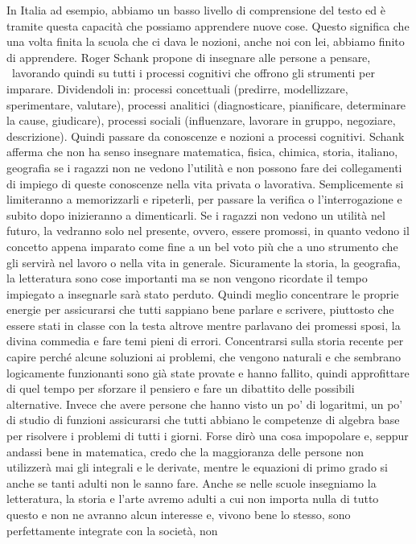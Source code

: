 \documentclass[12pt]{book} %
\begin{document}
In Italia ad esempio, abbiamo un basso livello di comprensione del testo ed è tramite questa capacità che possiamo
apprendere nuove cose. Questo significa che una volta finita la scuola che ci dava le nozioni, anche noi con lei,
abbiamo finito di apprendere. Roger Schank propone di insegnare alle persone a pensare, \ lavorando quindi su tutti i
processi cognitivi che offrono gli strumenti per imparare. Dividendoli in: processi concettuali (predirre,
modellizzare, sperimentare, valutare), processi analitici (diagnosticare, pianificare, determinare la cause,
giudicare), processi sociali (influenzare, lavorare in gruppo, negoziare, descrizione). Quindi passare da conoscenze e
nozioni a processi cognitivi. Schank afferma che non ha senso insegnare matematica, fisica, chimica, storia, italiano,
geografia se i ragazzi non ne vedono l'utilità e non possono fare dei collegamenti di impiego di
queste conoscenze nella vita privata o lavorativa. Semplicemente si limiteranno a memorizzarli e ripeterli, per passare
la verifica o l'interrogazione e subito dopo inizieranno a dimenticarli. Se i ragazzi non vedono
un utilità nel futuro, la vedranno solo nel presente, ovvero, essere promossi, in quanto vedono il concetto appena
imparato come fine a un bel voto più che a uno strumento che gli servirà nel lavoro o nella vita in generale.
Sicuramente la storia, la geografia, la letteratura sono cose importanti ma se non vengono ricordate il tempo impiegato
a insegnarle sarà stato perduto. Quindi meglio concentrare le proprie energie per assicurarsi che tutti sappiano bene
parlare e scrivere, piuttosto che essere stati in classe con la testa altrove mentre parlavano dei promessi sposi, la
divina commedia e fare temi pieni di errori. Concentrarsi sulla storia recente per capire perché alcune soluzioni ai
problemi, che vengono naturali e che sembrano logicamente funzionanti sono già state provate e hanno fallito, quindi
approfittare di quel tempo per sforzare il pensiero e fare un dibattito delle possibili alternative. Invece che avere
persone che hanno visto un po' di logaritmi, un po' di studio di funzioni assicurarsi che tutti
abbiano le competenze di algebra base per risolvere i problemi di tutti i giorni. Forse dirò una cosa impopolare e,
seppur andassi bene in matematica, credo che la maggioranza delle persone non utilizzerà mai gli integrali e le
derivate, mentre le equazioni di primo grado si anche se tanti adulti non le sanno fare. Anche se nelle scuole
insegniamo la letteratura, la storia e l'arte avremo adulti a cui non importa nulla di tutto
questo e non ne avranno alcun interesse e, vivono bene lo stesso, sono perfettamente integrate con la società, non
\end{document}
